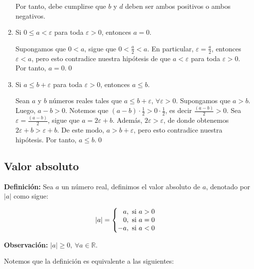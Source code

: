 \documentclass[11pt]{article}
\newcommand{\R}{\mathbb{R}}
\let\epsilon\varepsilon
\let\set\Set
\begin{document}
\begin{enumerate}[label=\alph*)]
    Por tanto, debe cumplirse que $b$ y $d$ deben ser ambos positivos o ambos negativos.

    \item Si $0 \leq a < \varepsilon$ para toda $\varepsilon > 0$, entonces $a=0$.
    
    Supongamos que $0<a$, sigue que $0<\frac{a}{2}<a$. En particular, $\epsilon=\frac{a}{2}$, entonces $\varepsilon<a$, pero esto contradice nuestra hipótesis de que $a< \varepsilon$ para toda $\varepsilon>0$. Por tanto, $a=0$.\qed

    \item Si $a \leq b + \varepsilon$ para toda $\varepsilon > 0$, entonces $a \leq b$.
    
    Sean $a$ y $b$ números reales tales que $a \leq b + \varepsilon$, $\forall \varepsilon > 0$. Supongamos que $a > b$. Luego, $a-b>0$. Notemos que $(a-b) \cdot \frac{1}{2} > 0 \cdot \frac{1}{2}$, es decir $\frac{(a-b)}{2} > 0$. Sea $\varepsilon = \frac{(a-b)}{2}$, sigue que $a=2\varepsilon+b$. Además, $2\varepsilon > \varepsilon$, de donde obtenemos $2 \varepsilon + b > \varepsilon + b$. De este modo, $a > b+\varepsilon$, pero esto contradice nuestra hipótesis. Por tanto, $a \leq b$.\qed

\end{enumerate}

%

\pagebreak

\subsection*{Valor absoluto}

\textbf{Definición:} Sea $a$ un número real, definimos el valor absoluto de $a$, denotado por $|a|$ como sigue:

    \[
        |a| = \left\{
    \begin{array}{@{}r@{\thinspace}l}
        a, &  \ \text{si}  \ a>0\\
        0, &  \ \text{si}  \ a=0\\
        -a, & \  \text{si} \  a<0
    \end{array} \right. \]

\textbf{Observación:} $|a|\geq 0, \ \forall a\in \R$.

Notemos que la definición es equivalente a las siguientes:
\end{document}
